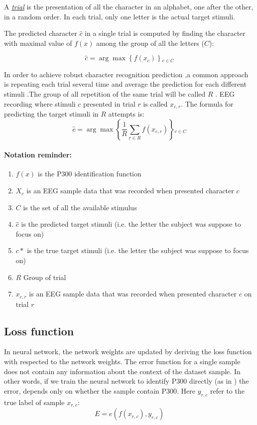 \documentclass[
12pt, %
english, %
doublespacing, %
headsepline, %
]{MastersDoctoralThesis} %
\begin{document}
A \underline{\textit{trial}} is the presentation of all the character in an alphabet, one after the other, in a random order. In each trial, only one letter is the actual target stimuli.  

The predicted character $\hat{c}$ in a single trial is computed by finding the character with maximal value of $f(x)$ among the group of all the letters ($C$):


\begin{equation}
\hat{c} = \arg \max \left\{ {f\left( {{x_{c}}} \right)} \right\}{  _{c \in C}}
\end{equation}

In order to achieve robust character recognition prediction ,a common approach is repeating each trial several time and average the prediction for each different stimuli .The group of all repetition of the same trial will be called $R$ . EEG recording where stimuli $c$ presented in trial $r$ is called $x_{c,r}$. The formula for predicting the target stimuli in $R$ attempts is:
\begin{equation}
\hat c = \arg \max \left\{ {\frac{1}{R}\sum\limits_{r \in R}^{} {f\left( {{x_{c,r}}} \right)} } \right\}{_{c \in C}}
\end{equation}

\paragraph{Notation reminder:}
\begin{enumerate}
	\item $f(x)$ is the P300 identification function
	\item $X_c$ is an EEG sample data that was recorded when presented character $c$
	\item $C$ is the set of all the available stimulus 
	\item $\hat{c}$ is the predicted target stimuli (i.e. the letter the subject was suppose to focus on)
	\item $c*$ is the true target stimuli (i.e. the letter the subject was suppose to focus on)	
	\item $R$ Group of trial
	\item $x_{c,r}$ is an EEG sample data that was recorded when presented character $c$ on trial $r$
	
\end{enumerate}

\subsection{Loss function}
In neural network, the network weights are updated by deriving the loss function with respected to the network weights. The error function for a single sample does not contain any information about the context of the dataset sample. In other words, if we train the neural network to identify P300 directly (as in \cite{P300_CNN}) the error, depends only on whether the sample contain P300. Here $y_{r,c}$ refer to the true label of sample $x_{r,c}$:
\begin{equation}
E = e\left( {f\left( {{x_{r,c}}} \right),{y_{r,c}}} \right)
\end{equation} 
\end{document}

